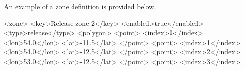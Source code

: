 \documentclass[
  letterpaper,
  DIV=11,
  numbers=noendperiod]{scrreprt}
\newenvironment{Shaded}{\begin{snugshade}}{\end{snugshade}}
\newcommand{\KeywordTok}[1]{\textcolor[rgb]{0.00,0.23,0.31}{#1}}
\newcommand{\NormalTok}[1]{\textcolor[rgb]{0.00,0.23,0.31}{#1}}
\begin{document}
An example of a zone definition is provided below.

\begin{Shaded}
\begin{Highlighting}[]
\NormalTok{\textless{}}\KeywordTok{zone}\NormalTok{\textgreater{}}
\NormalTok{    \textless{}}\KeywordTok{key}\NormalTok{\textgreater{}Release zone 2\textless{}/}\KeywordTok{key}\NormalTok{\textgreater{}}
\NormalTok{    \textless{}}\KeywordTok{enabled}\NormalTok{\textgreater{}true\textless{}/}\KeywordTok{enabled}\NormalTok{\textgreater{}}
\NormalTok{    \textless{}}\KeywordTok{type}\NormalTok{\textgreater{}release\textless{}/}\KeywordTok{type}\NormalTok{\textgreater{}}
\NormalTok{    \textless{}}\KeywordTok{polygon}\NormalTok{\textgreater{}}
\NormalTok{        \textless{}}\KeywordTok{point}\NormalTok{\textgreater{}}
\NormalTok{            \textless{}}\KeywordTok{index}\NormalTok{\textgreater{}0\textless{}/}\KeywordTok{index}\NormalTok{\textgreater{}}
\NormalTok{            \textless{}}\KeywordTok{lon}\NormalTok{\textgreater{}54.0\textless{}/}\KeywordTok{lon}\NormalTok{\textgreater{}}
\NormalTok{            \textless{}}\KeywordTok{lat}\NormalTok{\textgreater{}{-}11.5\textless{}/}\KeywordTok{lat}\NormalTok{\textgreater{}}
\NormalTok{        \textless{}/}\KeywordTok{point}\NormalTok{\textgreater{}}
\NormalTok{        \textless{}}\KeywordTok{point}\NormalTok{\textgreater{}}
\NormalTok{            \textless{}}\KeywordTok{index}\NormalTok{\textgreater{}1\textless{}/}\KeywordTok{index}\NormalTok{\textgreater{}}
\NormalTok{            \textless{}}\KeywordTok{lon}\NormalTok{\textgreater{}54.0\textless{}/}\KeywordTok{lon}\NormalTok{\textgreater{}}
\NormalTok{            \textless{}}\KeywordTok{lat}\NormalTok{\textgreater{}{-}12.5\textless{}/}\KeywordTok{lat}\NormalTok{\textgreater{}}
\NormalTok{        \textless{}/}\KeywordTok{point}\NormalTok{\textgreater{}}
\NormalTok{        \textless{}}\KeywordTok{point}\NormalTok{\textgreater{}}
\NormalTok{            \textless{}}\KeywordTok{index}\NormalTok{\textgreater{}2\textless{}/}\KeywordTok{index}\NormalTok{\textgreater{}}
\NormalTok{            \textless{}}\KeywordTok{lon}\NormalTok{\textgreater{}53.0\textless{}/}\KeywordTok{lon}\NormalTok{\textgreater{}}
\NormalTok{            \textless{}}\KeywordTok{lat}\NormalTok{\textgreater{}{-}12.5\textless{}/}\KeywordTok{lat}\NormalTok{\textgreater{}}
\NormalTok{        \textless{}/}\KeywordTok{point}\NormalTok{\textgreater{}}
\NormalTok{        \textless{}}\KeywordTok{point}\NormalTok{\textgreater{}}
\NormalTok{            \textless{}}\KeywordTok{index}\NormalTok{\textgreater{}3\textless{}/}\KeywordTok{index}\NormalTok{\textgreater{}}

\end{Highlighting}
\end{Shaded}
\end{document}
